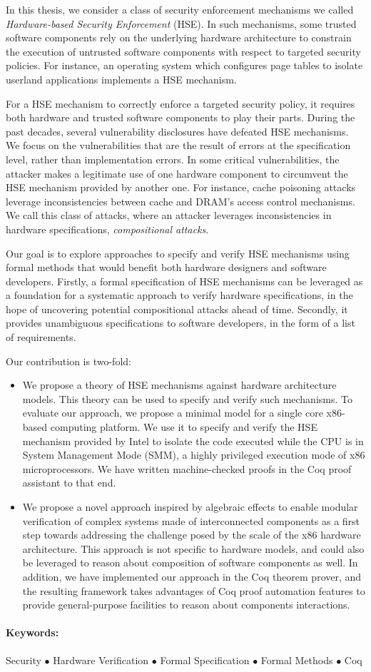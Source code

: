 In this thesis, we consider a class of security enforcement mechanisms we called
\emph{Hardware-based Security Enforcement} (HSE).
%
In such mechanisms, some trusted software components rely on the underlying
hardware architecture to constrain the execution of untrusted software
components with respect to targeted security policies.
%
For instance, an operating system which configures page tables to isolate userland
applications implements a HSE mechanism.

For a HSE mechanism to correctly enforce a targeted security policy, it requires
both hardware and trusted software components to play their parts.
%
During the past decades, several vulnerability disclosures have defeated HSE
mechanisms.
%
We focus on the vulnerabilities that are the result of errors at the
specification level, rather than implementation errors.
%
In some critical vulnerabilities, the attacker makes a legitimate use of one
hardware component to circumvent the HSE mechanism provided by another one.
%
For instance, cache poisoning attacks leverage inconsistencies between cache
and DRAM's access control mechanisms.
%
We call this class of attacks, where an attacker leverages inconsistencies in
hardware specifications, \emph{compositional attacks}.

Our goal is to explore approaches to specify and verify HSE mechanisms using
formal methods that would benefit both hardware designers and software
developers.
%
Firstly, a formal specification of HSE mechanisms can be leveraged as a
foundation for a systematic approach to verify hardware specifications, in the
hope of uncovering potential compositional attacks ahead of time.
%
Secondly, it provides unambiguous specifications to software developers, in the
form of a list of requirements.

Our contribution is two-fold:
%
\begin{itemize}
\item We propose a theory of HSE mechanisms against hardware
  architecture models. This theory can be used to specify and verify such
  mechanisms.
  To evaluate our approach, we propose a minimal model for a single core
  x86-based computing platform.
  We use it to specify and verify the HSE mechanism provided by Intel to isolate
  the code executed while the CPU is in System Management Mode (SMM), a highly
  privileged execution mode of x86 microprocessors.
  We have written machine-checked proofs in the Coq proof assistant to that
  end.
\item We propose a novel approach inspired by algebraic effects to enable
  modular verification of complex systems made of interconnected components as a first step towards addressing the challenge posed by the
  scale of the x86 hardware architecture.
  This approach is not specific to hardware models, and could also be leveraged
  to reason about composition of software components as well.
  In addition, we have implemented our approach in the Coq theorem prover, and
  the resulting framework takes advantages of Coq proof automation features to
  provide general-purpose facilities to reason about components interactions.
\end{itemize}

\paragraph{Keywords:}
%
Security $\bullet$ Hardware Verification $\bullet$ Formal Specification
$\bullet$ Formal Methods $\bullet$ Coq
